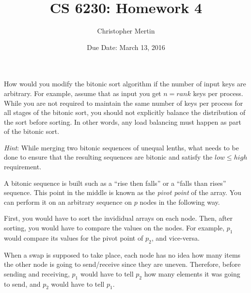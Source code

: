 \documentclass[addpoints]{exam}
\title{CS 6230: Homework 4}
\date{Due Date: March 13, 2016}
\author{Christopher Mertin}
\begin{document}
\maketitle

\pointname{}
\bonuspointname{}
\pointformat{[\bfseries\thepoints]}

\printanswers



\begin{questions}

How would you modify the bitonic sort algorithm if the number of input keys are arbitrary. For example, assume that as input you get $n = rank$ keys per process. While you are not required to maintain the same number of keys per process for all stages of the bitonic sort, you should not explicitly balance the distribution of the sort before sorting. In other words, any load balancing must happen as part of the bitonic sort.

{\em Hint}: While merging two bitonic sequences of unequal lenths, what needs to be done to ensure that the resulting sequences are bitonic and satisfy the $low \leq high$ requirement.

\begin{solution}
A bitonic sequence is built such as a ``rise then falls'' or a ``falls than rises'' sequence. This point in the middle is known as the {\em pivot point} of the array. You can perform it on an arbitrary sequence on $p$ nodes in the following way. 

First, you would have to sort the invididual arrays on each node. Then, after sorting, you would have to compare the values on the nodes. For example, $p_{1}$ would compare its values for the pivot point of $p_{2}$, and vice-versa. 

When a swap is supposed to take place, each node has no idea how many items the other node is going to send/receive since they are uneven. Therefore, before sending and receiving, $p_{1}$ would have to tell $p_{2}$ how many elements it was going to send, and $p_{2}$ would have to tell $p_{1}$.


\end{solution}
\end{questions}
\end{document}
